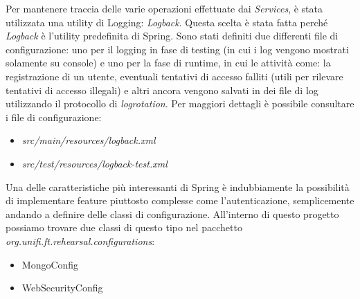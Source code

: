 Per mantenere traccia delle varie operazioni effettuate dai \textsl{Services}, è stata utilizzata una utility di Logging: \textsl{Logback}. Questa scelta è stata fatta perché \textsl{Logback} è l'utility predefinita di Spring.\newline
Sono stati definiti due differenti file di configurazione: uno per il logging in fase di testing (in cui i log vengono mostrati solamente su console) e uno per la fase di runtime, in cui le attività come: la registrazione di un utente, eventuali tentativi di accesso falliti (utili per rilevare tentativi di accesso illegali) e altri ancora vengono salvati in dei file di log utilizzando il protocollo di \textsl{logrotation}.\newline
Per maggiori dettagli è possibile consultare i file di configurazione:
\begin{itemize}
	\item \textsl{src/main/resources/logback.xml}
	\item \textsl{src/test/resources/logback-test.xml}
\end{itemize}

Una delle caratteristiche più interessanti di Spring è indubbiamente la possibilità di implementare feature piuttosto complesse come l'autenticazione, semplicemente andando a definire delle classi di configurazione.\newline
All'interno di questo progetto possiamo trovare due classi di questo tipo nel pacchetto \textsl{org.unifi.ft.rehearsal.configurations}:
\begin{itemize}
	\item MongoConfig
	\item WebSecurityConfig
\end{itemize}


